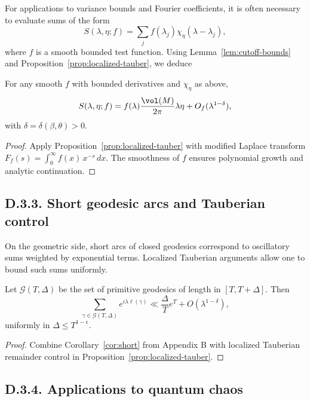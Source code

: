\noindent For applications to variance bounds and Fourier coefficients, it is often necessary to evaluate sums of the form
\[
S(\lambda,\eta;f) = \sum_j f(\lambda_j) \chi_\eta(\lambda-\lambda_j),
\]
where $f$ is a smooth bounded test function.  
Using Lemma~\ref{lem:cutoff-bounds} and Proposition~\ref{prop:localized-tauber}, we deduce

\begin{proposition}\label{prop:weighted-sum}
For any smooth $f$ with bounded derivatives and $\chi_\eta$ as above,
\[
S(\lambda,\eta;f) = f(\lambda) \frac{\vol(M)}{2\pi}\lambda\eta + O_f(\lambda^{1-\delta}),
\]
with $\delta=\delta(\beta,\theta)>0$.  
\end{proposition}

\begin{proof}
Apply Proposition~\ref{prop:localized-tauber} with modified Laplace transform $F_f(s)=\int_0^\infty f(x)\,x^{-s}\,dx$.  
The smoothness of $f$ ensures polynomial growth and analytic continuation.  
\end{proof}

\medskip

\subsection*{D.3.3. Short geodesic arcs and Tauberian control}

\noindent On the geometric side, short arcs of closed geodesics correspond to oscillatory sums weighted by exponential terms.  
Localized Tauberian arguments allow one to bound such sums uniformly.

\begin{lemma}\label{lem:arc}
Let $\mathcal G(T,\Delta)$ be the set of primitive geodesics of length in $[T,T+\Delta]$. Then
\[
\sum_{\gamma\in \mathcal G(T,\Delta)} e^{i\lambda \ell(\gamma)} \ll \frac{\Delta}{T}e^T + O(\lambda^{1-\delta}),
\]
uniformly in $\Delta\le T^{1-\epsilon}$.  
\end{lemma}

\begin{proof}
Combine Corollary~\ref{cor:short} from Appendix B with localized Tauberian remainder control in Proposition~\ref{prop:localized-tauber}.  
\end{proof}

\medskip

\subsection*{D.3.4. Applications to quantum chaos}

